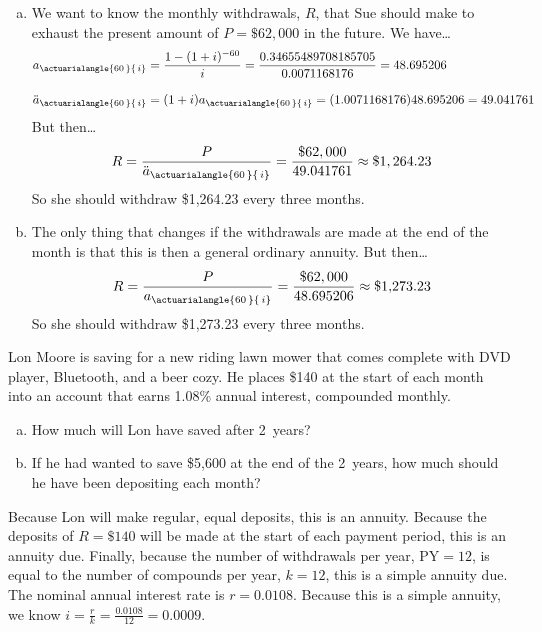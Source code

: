 \documentclass[11pt,letterpaper]{article}
\newcommand{\actA}[2]{a_{\actuarialangle{#1\,}{\,#2}}} %
\newcommand{\actAD}[2]{\ddot{a}_{\actuarialangle{#1\,}{\,#2}}} %
\begin{document}
\begin{enumerate}[(a)]
\item We want to know the monthly withdrawals, $R$, that Sue should make to exhaust the present amount of $P= \$62,000$ in the future. We have\dots
	\[
	\begin{aligned}
	\actA{60}{i}&= \dfrac{1 - (1 + i)^{-60}}{i}= \dfrac{0.34655489708185705}{0.0071168176}= 48.695206 \\[0.3cm]
	\actAD{60}{i}&= (1 + i) \actA{60}{i}= (1.0071168176) 48.695206= 49.041761
	\end{aligned}
	\]
But then\dots
	\[
	R= \dfrac{P}{\actAD{60}{i}}= \dfrac{\$62,000}{49.041761} \approx \$1,264.23
	\] 
So she should withdraw \$1,264.23 every three months. \pspace

\item The only thing that changes if the withdrawals are made at the end of the month is that this is then a general ordinary annuity. But then\dots
	\[
	R= \dfrac{P}{\actA{60}{i}}= \dfrac{\$62,000}{48.695206} \approx \$1,\!273.23
	\]
So she should withdraw \$1,273.23 every three months. 
\end{enumerate}



\newpage



 Lon Moore is saving for a new riding lawn mower that comes complete with DVD player, Bluetooth, and a beer cozy. He places \$140 at the start of each month into an account that earns 1.08\% annual interest, compounded monthly. 
	\begin{enumerate}[(a)]
	\item How much will Lon have saved after 2~years?
	\item If he had wanted to save \$5,600 at the end of the 2~years, how much should he have been depositing each month?	
	\end{enumerate} \pspace

\sol Because Lon will make regular, equal deposits, this is an annuity. Because the deposits of $R= \$140$ will be made at the start of each payment period, this is an annuity due. Finally, because the number of withdrawals per year, $\text{PY}= 12$, is equal to the number of compounds per year, $k= 12$, this is a simple annuity due. The nominal annual interest rate is $r= 0.0108$. Because this is a simple annuity, we know $i= \frac{r}{k}= \frac{0.0108}{12}= 0.0009$. \pspace
\end{document}
